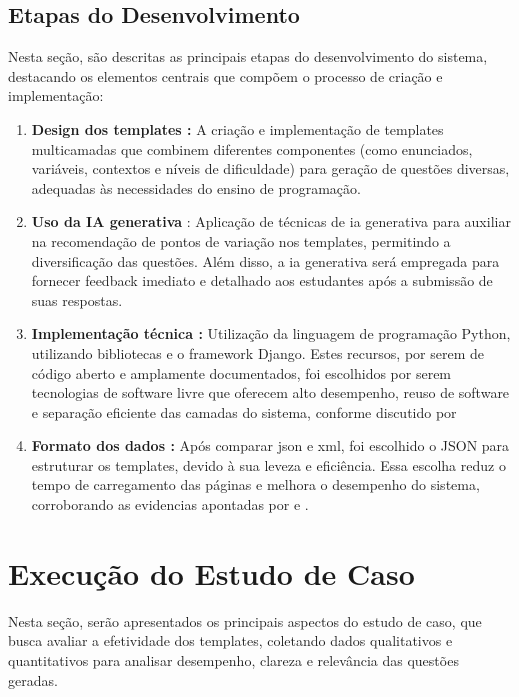 \subsection{Etapas do Desenvolvimento}
Nesta seção, são descritas as principais etapas do desenvolvimento do sistema, destacando os elementos centrais que compõem o processo de criação e implementação: 

\begin{enumerate}[label=\textbf{\alph*)}]
    \item \textbf{Design dos templates :}  A criação e implementação de templates multicamadas que combinem diferentes componentes (como enunciados, variáveis, contextos e níveis de dificuldade) para geração de questões diversas, adequadas às necessidades do ensino de programação.
    \item \textbf{Uso da IA generativa} : Aplicação de técnicas de \gls{ia} generativa para auxiliar na recomendação de pontos de variação nos templates, permitindo a diversificação das questões. Além disso, a \gls{ia} generativa será empregada para fornecer feedback imediato e detalhado aos estudantes após a submissão de suas respostas.
    \item \textbf{Implementação técnica :}  Utilização da linguagem de programação Python, utilizando bibliotecas e o framework Django. Estes recursos, por serem de código aberto e amplamente documentados, foi escolhidos por serem tecnologias de software livre que oferecem alto desempenho, reuso de software e separação eficiente das camadas do sistema, conforme discutido por  \parencite{rubio2017}
    \item \textbf{Formato dos dados :}  Após comparar \gls{json} e \gls{xml}, foi escolhido o JSON para estruturar os templates, devido à sua leveza e eficiência. Essa escolha reduz o tempo de carregamento das páginas e melhora o desempenho do sistema, corroborando as evidencias apontadas por  \parencite{goyal2017} e \parencite{wang2011} .
\end{enumerate}

\section{Execução do Estudo de Caso}

Nesta seção, serão apresentados os principais aspectos do estudo de caso, que busca avaliar a efetividade dos templates, coletando dados qualitativos e quantitativos para analisar desempenho, clareza e relevância das questões geradas. 

